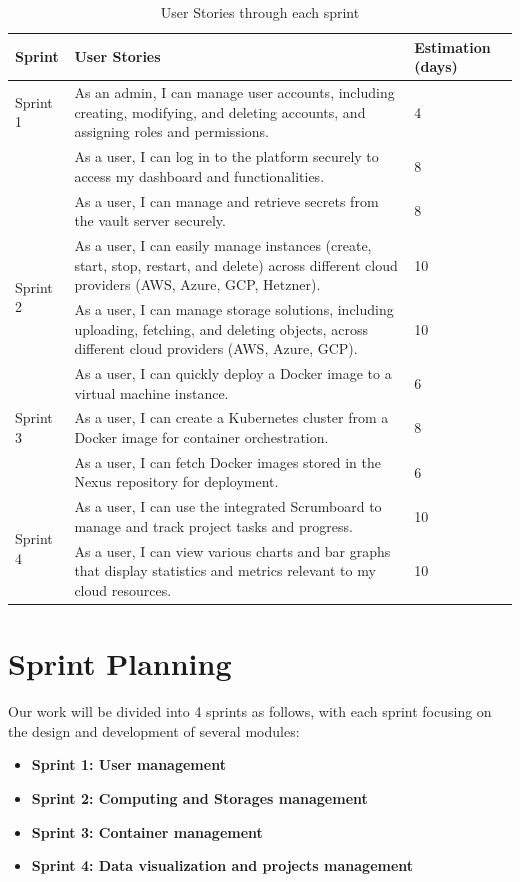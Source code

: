\begin{table}[h!]
\centering
\caption{User Stories through each sprint}
\label{tab:sprints_backlog}
\begin{tabular}{|p{2cm}|p{10cm}|p{2cm}|}
\hline
\textbf{Sprint} & \textbf{User Stories} & \textbf{Estimation (days)} \\ \hline
Sprint 1 
& As an admin, I can manage user accounts, including creating, modifying, and deleting accounts, and assigning roles and permissions. & 4 \\ \cline{2-3}
& As a user, I can log in to the platform securely to access my dashboard and functionalities. & 8 \\ \cline{2-3}
& As a user, I can manage and retrieve secrets from the vault server securely. & 8  \\ \hline

\multirow{2}{*}{Sprint 2} 
& As a user, I can easily manage instances (create, start, stop, restart, and delete) across different cloud providers (AWS, Azure, GCP, Hetzner). & 10 \\ \cline{2-3}
& As a user, I can manage storage solutions, including uploading, fetching, and deleting objects, across different cloud providers (AWS, Azure, GCP). & 10 \\ \hline

\multirow{3}{*}{Sprint 3}
& As a user, I can quickly deploy a Docker image to a virtual machine instance. & 6 \\ \cline{2-3}
& As a user, I can create a Kubernetes cluster from a Docker image for container orchestration. & 8 \\ \cline{2-3}
& As a user, I can fetch Docker images stored in the Nexus repository for deployment. & 6 \\ \hline

\multirow{2}{*}{Sprint 4}
& As a user, I can use the integrated Scrumboard to manage and track project tasks and progress. & 10 \\ \cline{2-3}
& As a user, I can view various charts and bar graphs that display statistics and metrics relevant to my cloud resources. & 10  \\ \hline
\end{tabular}
\end{table}

\section{Sprint Planning}
Our work will be divided into 4 sprints as follows, with each sprint focusing on the design and development of several modules:
\begin{itemize}
  \item \textbf{Sprint 1: User management}
  \item \textbf{Sprint 2: Computing and Storages management}
  \item \textbf{Sprint 3: Container management}
  \item \textbf{Sprint 4: Data visualization and projects management}
\end{itemize}


